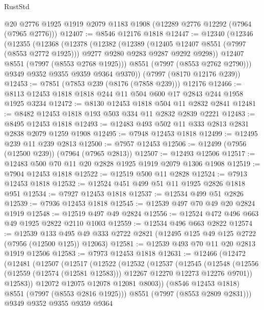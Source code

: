 \begin{lexlean}{RustStd}
\begin{coremodule}
{\begin{coremodule}
{{{{{{{{{{{{{{{{{{{{{{{{{{{{{{{{{{{{{{{{{{{    @20
    @2776
    @1925
    @1919
    @2079
    @1183
    @1908
    (@12289 @2776 @12292 (@7964 (@7965 @2776)))
@12407 := @8546 @12176 @1818
@12447 := @12340
    (@12346
      (@12355
        (@12368
          (@12378
            (@12382
              (@12389
                (@12405 @12407 @8551 (@7997 (@8553 @2772 @1925)))
                @9277
                @9280
                @9283
                @9287
                @9292
                @9298))
            @12407
            @8551
            (@7997 (@8553 @2768 @1925)))
          @8551
          (@7997 (@8553 @2762 @2790)))
        @9349
        @9352
        @9355
        @9359
        @9364
        @9370))
    (@7997 (@8170 @12176 @239))
@12453 := @7851 (@7853 @239 (@8176 (@7858 @239))) @12176
@12466 := @8113 @12453 @1818 @1818 @244 @11 @504 @600 @17 @2843 @244 @1958 @1925 @3234
@12472 := @8130 @12453 @1818 @504 @11 @2832 @2841
@12481 := @8482 @12453 @1818 @193 @503 @334 @11 @2832 @2839 @2221
@12483 := @8495 @12453 @1818
@12493 := @12483 @493 @502 @11 @333 @2813 @2831 @2838 @2079 @1259 @1908
@12495 := @7948 @12453 @1818
@12499 := @12495 @239 @11 @239 @2813
@12500 := @7957 @12453
@12506 := @12499 (@7956 (@12500 @239)) (@7964 (@7965 @2813))
@12507 := @12493 @12506
@12517 := @12483 @500 @70 @11 @20 @2828 @1925 @1919 @2079 @1306 @1908
@12519 := @7904 @12453 @1818
@12522 := @12519 @500 @11 @2828
@12524 := @7913 @12453 @1818
@12532 := @12524 @451 @499 @51 @11 @1925 @2826 @1818 @951
@12534 := @7927 @12453 @1818
@12537 := @12534 @499 @51 @2826
@12539 := @7936 @12453 @1818
@12545 := @12539 @497 @70 @49 @20 @2824 @1919
@12548 := @12519 @497 @49 @2824
@12556 := @12524 @472 @496 @663 @49 @1925 @2822 @2110 @1003
@12559 := @12534 @496 @663 @2822
@12574 := @12539
    @133
    @495
    @49
    @333
    @2722
    @2821
    (@12495 @125 @49 @125 @2722 (@7956 (@12500 @125)) @12063)
@12581 := @12539 @493 @70 @11 @20 @2813 @1919 @12506
@12583 := @7973 @12453 @1818
@12631 := @12466
    (@12472
      (@12481
        (@12507
          (@12517
            (@12522
              (@12532
                (@12537
                  (@12545
                    (@12548
                      (@12556 (@12559 (@12574 (@12581 @12583))) @12267 @12270 @12273 @12276 @9701))
                    @12583))
                @12072
                @12075
                @12078
                @12081
                @8003))
            (@8546 @12453 @1818)
            @8551
            (@7997 (@8553 @2816 @1925)))
          @8551
          (@7997 (@8553 @2809 @2831)))
        @9349
        @9352
        @9355
        @9359
        @9364
}}}}}}}}}}}}}}}}}}}}}}}}}}}}}}}}}}}}}}}}}}}
\end{coremodule}}
\end{coremodule}
\end{lexlean}
